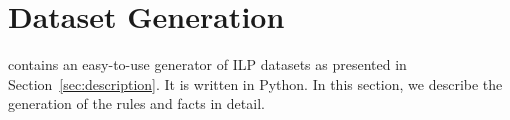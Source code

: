 \section{Dataset Generation}\label{sec:generation}

\tool contains an easy-to-use generator of ILP datasets 
as %
presented in Section~\ref{sec:description}. 
It is written in Python. In this section, we describe the generation of the rules and facts in detail.

